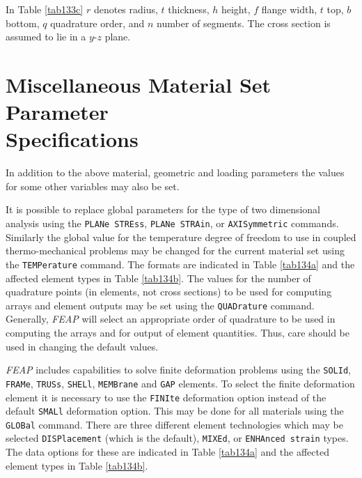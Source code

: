 In Table \ref{tab133c} $r$ denotes radius, $t$ thickness, $h$ height, $f$
flange width, $t$ top, $b$ bottom, $q$ quadrature order, and $n$ number
of segments.  The cross section is assumed to lie in a $y$-$z$ plane.

\section{Miscellaneous Material Set Parameter \\ Specifications}
\label{miscmat}

In addition to the above material, geometric and loading parameters the
values for some other variables may also be set.

It is possible to replace global parameters for the type of two dimensional
analysis using the {\tt PLANe STREss}, {\tt PLANe STRAin}, or {\tt AXISymmetric}
commands.  Similarly the global value for the temperature degree of
freedom to use in coupled thermo-mechanical problems may be changed
for the current material set using the {\tt TEMPerature} command.  The
formats are indicated in Table \ref{tab134a} and the affected element types in
Table \ref{tab134b}.
The values for the number of quadrature points (in elements, not cross sections)
to be used for computing arrays and element
outputs may be set using the {\tt QUADrature} command.
Generally, {\sl FEAP} will select an appropriate order of quadrature to
be used in computing the arrays and for output of element quantities.  Thus,
care should be used in changing the default values.

{\sl FEAP} includes capabilities to solve finite deformation problems
using the {\tt SOLId}, {\tt FRAMe}, {\tt TRUSs}, {\tt SHELl}, {\tt MEMBrane}
and {\tt GAP} elements.  To select the
finite deformation element it is necessary to use the {\tt FINIte} deformation
option instead of the default {\tt SMALl} deformation option.
This may be done for all materials using the {\tt GLOBal} command.
There are three different element technologies
which may be selected {\tt DISPlacement} (which is the default), {\tt MIXEd},
or {\tt ENHAnced strain} types. The data options for these are indicated
in Table \ref{tab134a} and the affected element types in Table \ref{tab134b}.

